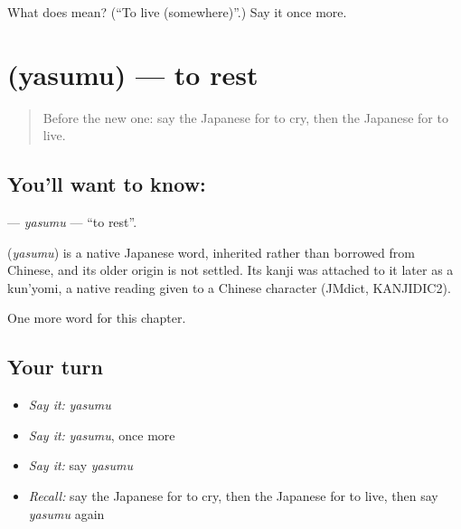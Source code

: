 \begin{tcolorbox}[breakable,colback=teal!4,colframe=teal!35!black,title={Before you move on}]
What does  mean? (\textquotedblleft{}To live (somewhere)\textquotedblright{}.) Say it once more.
\end{tcolorbox}
\section[\texorpdfstring{\ja{やすむ} (yasumu)}{やすむ (yasumu)}]{ (yasumu) — to rest}

\label{lesson:JA-C29-yasumu}



\begin{quote}
Before the new one: say the Japanese for to cry, then the Japanese for to live.
\end{quote}

\subsection*{You'll want to know: }
\textbf{} — \emph{yasumu} — \textquotedblleft{}to rest\textquotedblright{}.

\begin{cousinweb}
\textbf{} (\emph{yasumu}) is a native Japanese word, inherited rather than borrowed from Chinese, and its older origin is not settled. Its kanji was attached to it later as a kun'yomi, a native reading given to a Chinese character (JMdict, KANJIDIC2).
\end{cousinweb}

\begin{grammarlens}[title={What you've built}]
One more word for this chapter.
\end{grammarlens}

\subsection*{Your turn}
\begin{itemize}
\raggedright
  \item \emph{Say it:} \emph{yasumu}
  \item \emph{Say it:} \emph{yasumu}, once more
  \item \emph{Say it:} say \emph{yasumu}
  \item \emph{Recall:} say the Japanese for to cry, then the Japanese for to live, then say \emph{yasumu} again
\end{itemize}

